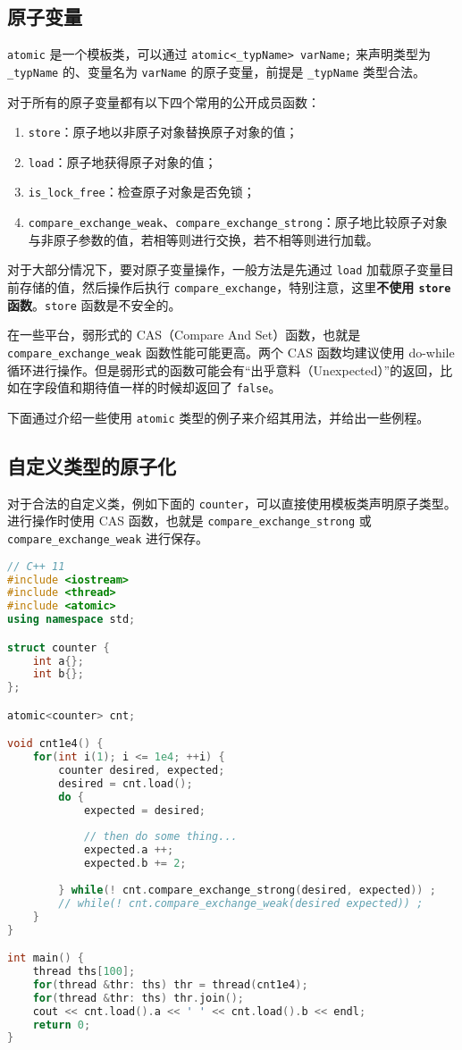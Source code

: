 \subsection{原子变量}
\verb`atomic` 是一个模板类，可以通过 \verb`atomic<_typName> varName;` 来声明类型为 \verb`_typName` 的、变量名为 \verb`varName` 的原子变量，前提是 \verb`_typName` 类型合法。

对于所有的原子变量都有以下四个常用的公开成员函数：
\begin{enumerate}
\item \verb`store`：原子地以非原子对象替换原子对象的值；
\item \verb`load`：原子地获得原子对象的值；
\item \verb`is_lock_free`：检查原子对象是否免锁；
\item \verb`compare_exchange_weak`、\verb`compare_exchange_strong`：原子地比较原子对象与非原子参数的值，若相等则进行交换，若不相等则进行加载。
\end{enumerate}

对于大部分情况下，要对原子变量操作，一般方法是先通过 \verb`load` 加载原子变量目前存储的值，然后操作后执行 \verb`compare_exchange`，特别注意，这里\textbf{不使用 \verb`store` 函数}。\verb`store` 函数是不安全的。

在一些平台，弱形式的 CAS（Compare And Set）函数，也就是 \verb`compare_exchange_weak` 函数性能可能更高。两个 CAS 函数均建议使用 do-while 循环进行操作。但是弱形式的函数可能会有“出乎意料（Unexpected）”的返回，比如在字段值和期待值一样的时候却返回了 \verb`false`。

下面通过介绍一些使用 \verb`atomic` 类型的例子来介绍其用法，并给出一些例程。

\subsection{自定义类型的原子化}
对于合法的自定义类，例如下面的 \verb`counter`，可以直接使用模板类声明原子类型。进行操作时使用 CAS 函数，也就是 \verb`compare_exchange_strong` 或 \verb`compare_exchange_weak` 进行保存。

\begin{lstlisting}[language=cpp]
// C++ 11
#include <iostream>
#include <thread>
#include <atomic>
using namespace std;

struct counter {
	int a{};
	int b{};
};

atomic<counter> cnt;

void cnt1e4() {
	for(int i(1); i <= 1e4; ++i) {
		counter desired, expected;
		desired = cnt.load();
		do {
			expected = desired;
			
			// then do some thing...
			expected.a ++;
			expected.b += 2;
			
		} while(! cnt.compare_exchange_strong(desired, expected)) ;
		// while(! cnt.compare_exchange_weak(desired expected)) ;
	}
}

int main() {
	thread ths[100];
	for(thread &thr: ths) thr = thread(cnt1e4);
	for(thread &thr: ths) thr.join();
	cout << cnt.load().a << ' ' << cnt.load().b << endl;
	return 0;
}
\end{lstlisting}

